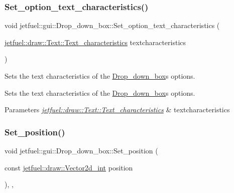 \subsubsection{\texorpdfstring{Set\+\_\+option\+\_\+text\+\_\+characteristics()}{Set\_option\_text\_characteristics()}}
{\footnotesize\ttfamily void jetfuel\+::gui\+::\+Drop\+\_\+down\+\_\+box\+::\+Set\+\_\+option\+\_\+text\+\_\+characteristics (\begin{DoxyParamCaption}\item[{\hyperlink{structjetfuel_1_1draw_1_1Text_1_1Text__characteristics}{jetfuel\+::draw\+::\+Text\+::\+Text\+\_\+characteristics}}]{textcharacteristics }\end{DoxyParamCaption})\hspace{0.3cm}{\ttfamily [inline]}}



Sets the text characteristics of the \hyperlink{classjetfuel_1_1gui_1_1Drop__down__box}{Drop\+\_\+down\+\_\+box}\textquotesingle{}s options. 

Sets the text characteristics of the \hyperlink{classjetfuel_1_1gui_1_1Drop__down__box}{Drop\+\_\+down\+\_\+box}\textquotesingle{}s options.


\begin{DoxyParams}{Parameters}
{\em \hyperlink{structjetfuel_1_1draw_1_1Text_1_1Text__characteristics}{jetfuel\+::draw\+::\+Text\+::\+Text\+\_\+characteristics}} & textcharacteristics \\
\hline
\end{DoxyParams}
\mbox{\label{classjetfuel_1_1gui_1_1Drop__down__box_acba86706261397994c96727a0184a78c}} 
\subsubsection{\texorpdfstring{Set\+\_\+position()}{Set\_position()}}
{\footnotesize\ttfamily void jetfuel\+::gui\+::\+Drop\+\_\+down\+\_\+box\+::\+Set\+\_\+position (\begin{DoxyParamCaption}\item[{const \hyperlink{classjetfuel_1_1draw_1_1Vector2d}{jetfuel\+::draw\+::\+Vector2d\+\_\+int}}]{position }\end{DoxyParamCaption})\hspace{0.3cm}{\ttfamily [inline]}, {\ttfamily [override]}, {\ttfamily [virtual]}}



